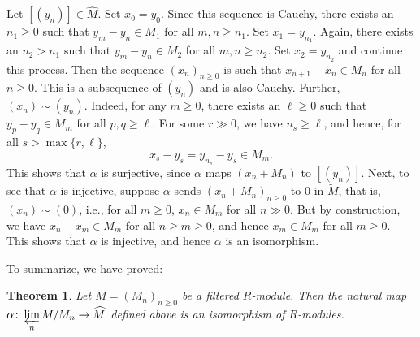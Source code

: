 \documentclass[11pt]{article}
\theoremstyle{thmstyle}
\newtheorem{theorem}{Theorem}[section]
\theoremstyle{defstyle}
\newcommand{\wt}[1]{\widetilde{#1}}
\newcommand{\wh}[1]{\widehat{#1}}
\renewcommand{\ge}{\geqslant}
\begin{document}
Let $[(y_n)]\in\wh M$. Set $x_0 = y_0$. Since this sequence is Cauchy, there exists an $n_1\ge 0$ such that $y_m - y_n\in M_1$ for all $m,n\ge n_1$. Set $x_1 = y_{n_1}$. Again, there exists an $n_2 > n_1$ such that $y_m - y_n\in M_2$ for all $m,n\ge n_2$. Set $x_2 = y_{n_2}$ and continue this process. Then the sequence $(x_n)_{n\ge 0}$ is such that $x_{n + 1} - x_n\in M_n$ for all $n\ge 0$. This is a subsequence of $(y_n)$ and is also Cauchy. Further, $(x_n)\sim (y_n)$. Indeed, for any $m\ge 0$, there exists an $\ell\ge 0$ such that $y_p - y_q\in M_m$ for all $p, q\ge\ell$. For some $r\gg0$, we have $n_s\ge\ell$, and hence, for all $s > \max\{r, \ell\}$,
\begin{equation*}
    x_s - y_s = y_{n_s} - y_s\in M_m.
\end{equation*}
This shows that $\alpha$ is surjective, since $\alpha$ maps $(x_n + M_n)$ to $\left[(y_n)\right]$. Next, to see that $\alpha$ is injective, suppose $\alpha$ sends $(x_n + M_n)_{n\ge 0}$ to $0$ in $\wt M$, that is, $(x_n)\sim(0)$, i.e., for all $m\ge 0$, $x_n\in M_m$ for all $n\gg 0$. But by construction, we have $x_n - x_m\in M_m$ for all $n\ge m\ge 0$, and hence $x_m\in M_m$ for all $m\ge 0$. This shows that $\alpha$ is injective, and hence $\alpha$ is an isomorphism.

To summarize, we have proved: 
\begin{theorem}
    Let $M = (M_n)_{n\ge 0}$ be a filtered $R$-module. Then the natural map $\displaystyle\alpha\colon\varprojlim_n M/M_n\to\wh M$ defined above is an isomorphism of $R$-modules.
\end{theorem}
\end{document}
